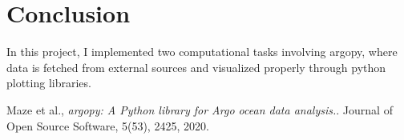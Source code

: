 \documentclass[12pt]{article}
\begin{document}
\section{Conclusion}
In this project, I implemented two computational tasks involving argopy, where
data is fetched from external sources and visualized properly through python plotting
libraries.

\begin{thebibliography}{9}
    Maze et al.,
    \textit{argopy: A Python library for Argo ocean data analysis.}. 
    Journal of Open Source Software, 5(53), 2425, 2020.
\end{thebibliography}
\end{document}
